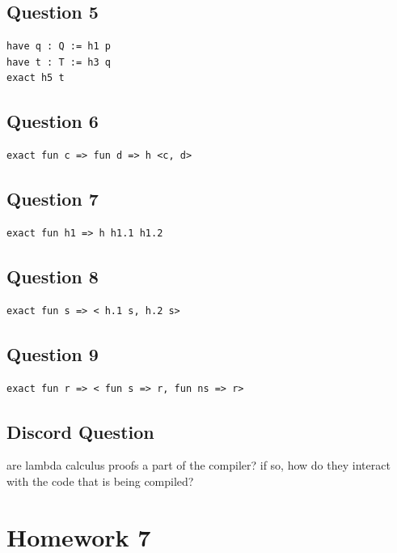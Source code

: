 \documentclass{article}
\theoremstyle{plain}
\theoremstyle{definition}
\theoremstyle{remark}
\begin{document}
\subsection{Question 5}

\begin{lstlisting}
have q : Q := h1 p
have t : T := h3 q
exact h5 t
\end{lstlisting}

\subsection{Question 6}

\begin{lstlisting}
exact fun c => fun d => h <c, d>
\end{lstlisting}

\subsection{Question 7}

\begin{lstlisting}
exact fun h1 => h h1.1 h1.2
\end{lstlisting}

\subsection{Question 8}

\begin{lstlisting}
exact fun s => < h.1 s, h.2 s>
\end{lstlisting}

\subsection{Question 9}

\begin{lstlisting}
exact fun r => < fun s => r, fun ns => r>
\end{lstlisting}

\subsection{Discord Question}

are lambda calculus proofs a part of the compiler? if so, how do they interact with the code that is being compiled?


\section{Homework 7}\label{homework7}
\end{document}
